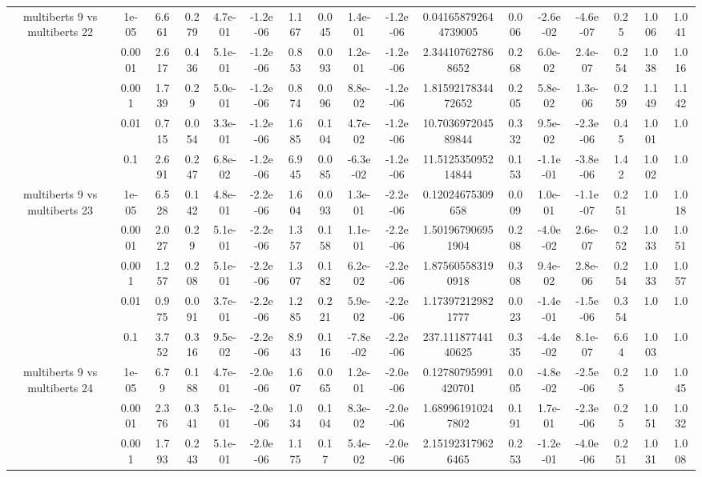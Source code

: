 \begin{tabular}{|c|c|c|c|c|c|c|c|c|c|c|c|c|c|c|c|c|}
\hline
\multirow{5}{*}{multiberts 9 vs multiberts 22} & 1e-05 & 6.661 & 0.279 & 4.7e-01 & -1.2e-06 & 1.167 & 0.045 & 1.4e-01 & -1.2e-06 & 0.041658792644739005 & 0.006 & -2.6e-02 & -4.6e-07 & 0.25 & 1.006 & 1.041 \\
 & 0.0001 & 2.617 & 0.436 & 5.1e-01 & -1.2e-06 & 0.853 & 0.093 & 1.2e-01 & -1.2e-06 & 2.344107627868652 & 0.268 & 6.0e-02 & 2.4e-07 & 0.254 & 1.038 & 1.016 \\
 & 0.001 & 1.739 & 0.29 & 5.0e-01 & -1.2e-06 & 0.874 & 0.096 & 8.8e-02 & -1.2e-06 & 1.8159217834472652 & 0.205 & 5.8e-02 & 1.3e-06 & 0.259 & 1.149 & 1.142 \\
 & 0.01 & 0.715 & 0.054 & 3.3e-01 & -1.2e-06 & 1.685 & 0.104 & 4.7e-02 & -1.2e-06 & 10.703697204589844 & 0.332 & 9.5e-02 & -2.3e-06 & 0.45 & 1.001 & 1.0 \\
 & 0.1 & 2.691 & 0.247 & 6.8e-02 & -1.2e-06 & 6.945 & 0.085 & -6.3e-02 & -1.2e-06 & 11.512535095214844 & 0.153 & -1.1e-01 & -3.8e-06 & 1.42 & 1.002 & 1.0 \\
\hline
\multirow{5}{*}{multiberts 9 vs multiberts 23} & 1e-05 & 6.528 & 0.142 & 4.8e-01 & -2.2e-06 & 1.604 & 0.093 & 1.3e-01 & -2.2e-06 & 0.12024675309658 & 0.009 & 1.0e-01 & -1.1e-07 & 0.251 & 1.0 & 1.018 \\
 & 0.0001 & 2.027 & 0.29 & 5.1e-01 & -2.2e-06 & 1.357 & 0.158 & 1.1e-01 & -2.2e-06 & 1.501967906951904 & 0.208 & -4.0e-02 & 2.6e-07 & 0.252 & 1.033 & 1.051 \\
 & 0.001 & 1.257 & 0.208 & 5.1e-01 & -2.2e-06 & 1.307 & 0.182 & 6.2e-02 & -2.2e-06 & 1.875605583190918 & 0.308 & 9.4e-02 & 2.8e-06 & 0.254 & 1.033 & 1.057 \\
 & 0.01 & 0.975 & 0.091 & 3.7e-01 & -2.2e-06 & 1.285 & 0.221 & 5.9e-02 & -2.2e-06 & 1.173972129821777 & 0.023 & -1.4e-01 & -1.5e-06 & 0.354 & 1.0 & 1.0 \\
 & 0.1 & 3.752 & 0.316 & 9.5e-02 & -2.2e-06 & 8.943 & 0.116 & -7.8e-02 & -2.2e-06 & 237.11187744140625 & 0.335 & -4.4e-02 & 8.1e-07 & 6.64 & 1.003 & 1.0 \\
\hline
\multirow{5}{*}{multiberts 9 vs multiberts 24} & 1e-05 & 6.79 & 0.188 & 4.7e-01 & -2.0e-06 & 1.607 & 0.065 & 1.2e-01 & -2.0e-06 & 0.12780795991420701 & 0.005 & -4.8e-02 & -2.5e-06 & 0.25 & 1.0 & 1.045 \\
 & 0.0001 & 2.376 & 0.341 & 5.1e-01 & -2.0e-06 & 1.034 & 0.104 & 8.3e-02 & -2.0e-06 & 1.689961910247802 & 0.191 & 1.7e-01 & -2.3e-06 & 0.25 & 1.051 & 1.032 \\
 & 0.001 & 1.793 & 0.243 & 5.1e-01 & -2.0e-06 & 1.175 & 0.17 & 5.4e-02 & -2.0e-06 & 2.151923179626465 & 0.253 & -1.2e-01 & -4.0e-06 & 0.251 & 1.031 & 1.008 \\

\end{tabular}
